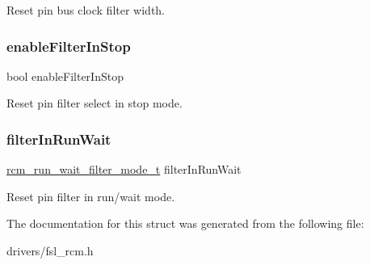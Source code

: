 Reset pin bus clock filter width. \mbox{\label{struct__rcm__reset__pin__filter__config_aff8dcaa8b1dd6142618d5e99b6e36874}} 
\subsubsection{\texorpdfstring{enableFilterInStop}{enableFilterInStop}}
{\footnotesize\ttfamily bool enable\+Filter\+In\+Stop}

Reset pin filter select in stop mode. \mbox{\label{struct__rcm__reset__pin__filter__config_afae01c1325f9d9d8ea5ec3a53ee6ecff}} 
\subsubsection{\texorpdfstring{filterInRunWait}{filterInRunWait}}
{\footnotesize\ttfamily \mbox{\hyperlink{group__rcm_gab04818291759684817621ea4afa2466d}{rcm\+\_\+run\+\_\+wait\+\_\+filter\+\_\+mode\+\_\+t}} filter\+In\+Run\+Wait}

Reset pin filter in run/wait mode. 

The documentation for this struct was generated from the following file\+:\begin{DoxyCompactItemize}
\item 
drivers/fsl\+\_\+rcm.\+h\end{DoxyCompactItemize}
